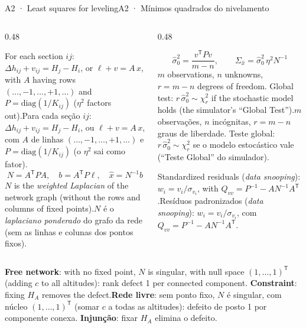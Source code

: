 \documentclass[aspectratio=169,11pt]{beamer}
\newcommand{\tr}[2]{\ifEN#2\else#1\fi}
\begin{document}
\begin{frame}{\tr{A2 · Mínimos quadrados do nivelamento}{A2 · Least squares for leveling}}
  \scriptsize
  \begin{columns}[onlytextwidth]
    \begin{column}{0.48\textwidth}
      \begin{tcolorbox}[colback=mStoneLight, colframe=mStone, title={\tr{Modelo e solução}{Model and solution}}]
        \scriptsize
        \tr{Para cada seção $ij$: $\Delta h_{ij}+v_{ij}=H_j-H_i$, ou $\ell+v=A\,x$, com $A$ de linhas $(\dots,-1,\dots,+1,\dots)$ e $P=\mathrm{diag}(1/K_{ij})$ (o $\eta^{2}$ sai como fator).}{For each section $ij$: $\Delta h_{ij}+v_{ij}=H_j-H_i$, or $\ell+v=A\,x$, with $A$ having rows $(\dots,-1,\dots,+1,\dots)$ and $P=\mathrm{diag}(1/K_{ij})$ ($\eta^{2}$ factors out).}
        \begin{equation*}
          N=A^{\mathsf T}PA,\quad b=A^{\mathsf T}P\ell,\quad \hat x=N^{-1}b
        \end{equation*}
        \tr{$N$ é o \emph{laplaciano ponderado} do grafo da rede (sem as linhas e colunas dos pontos fixos).}{$N$ is the \emph{weighted Laplacian} of the network graph (without the rows and columns of fixed points).}
      \end{tcolorbox}
    \end{column}
    \begin{column}{0.48\textwidth}
      \begin{tcolorbox}[colback=mTeal!8, colframe=mTeal, title={\tr{Precisão}{Precision}}]
        \scriptsize
        \begin{equation*}
          \hat\sigma_0^{2}=\frac{v^{\mathsf T}Pv}{m-n},\qquad
          \Sigma_{\hat x}=\hat\sigma_0^{2}\,\eta^{2}N^{-1}
        \end{equation*}
        \tr{$m$ observações, $n$ incógnitas, $r=m-n$ graus de liberdade. Teste global: $r\,\hat\sigma_0^{2}\sim\chi^{2}_{r}$ se o modelo estocástico vale (``Teste Global'' do simulador).}{$m$ observations, $n$ unknowns, $r=m-n$ degrees of freedom. Global test: $r\,\hat\sigma_0^{2}\sim\chi^{2}_{r}$ if the stochastic model holds (the simulator's ``Global Test'').}
        \smallskip

        \tr{Resíduos padronizados (\emph{data snooping}): $w_i=v_i/\sigma_{v_i}$, com $Q_{vv}=P^{-1}-AN^{-1}A^{\mathsf T}$.}{Standardized residuals (\emph{data snooping}): $w_i=v_i/\sigma_{v_i}$, with $Q_{vv}=P^{-1}-AN^{-1}A^{\mathsf T}$.}
      \end{tcolorbox}
    \end{column}
  \end{columns}
  \medskip
  \tr{\textbf{Rede livre}: sem ponto fixo, $N$ é singular, com núcleo $(1,\dots,1)^{\mathsf T}$ (somar $c$ a todas as altitudes): defeito de posto \num{1} por componente conexa. \textbf{Injunção}: fixar $H_A$ elimina o defeito.}{\textbf{Free network}: with no fixed point, $N$ is singular, with null space $(1,\dots,1)^{\mathsf T}$ (adding $c$ to all altitudes): rank defect \num{1} per connected component. \textbf{Constraint}: fixing $H_A$ removes the defect.}
\end{frame}
\end{document}

